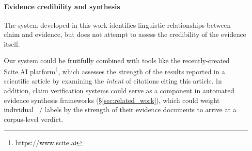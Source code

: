 
\paragraph{Evidence credibility and synthesis}

The system developed in this work identifies linguistic relationships between claim and evidence, but does not attempt to assess the credibility of the evidence itself.



Our system could be fruitfully combined with tools like the recently-created Scite.AI platform\footnote{https://www.scite.ai}, which assesses the strength of the results reported in a scientific article by examining the \emph{intent} of citations citing this article. In addition, claim verification systems could serve as a component in automated evidence synthesis frameworks (\S\ref{sec:related_work}), which could weight individual \supports\ /  labels by the strength of their evidence documents to arrive at a corpus-level verdict.

